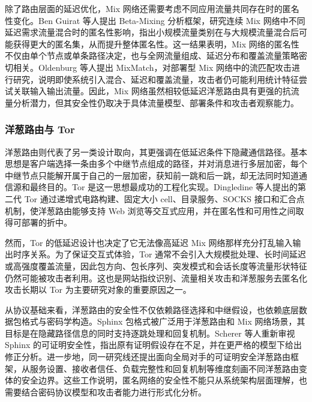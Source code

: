 除了路由层面的延迟优化，Mix 网络还需要考虑不同应用流量共同存在时的匿名性变化。Ben Guirat 等人提出 Beta-Mixing 分析框架，研究连续 Mix 网络中不同延迟需求流量混合时的匿名性影响，指出小规模流量类别在与大规模流量混合后可能获得更大的匿名集，从而提升整体匿名性\cite{ben2024blending}。这一结果表明，Mix 网络的匿名性不仅由单个节点或单条路径决定，也与全网流量组成、延迟分布和覆盖流量策略密切相关。Oldenburg 等人提出 MixMatch，对部署型 Mix 网络中的流匹配攻击进行研究，说明即使系统引入混合、延迟和覆盖流量，攻击者仍可能利用统计特征尝试关联输入输出流量\cite{oldenburg2024mixmatch}。因此，Mix 网络虽然相较低延迟洋葱路由具有更强的抗流量分析潜力，但其安全性仍取决于具体流量模型、部署条件和攻击者观察能力。

\subsubsection{洋葱路由与 Tor}
洋葱路由则代表了另一类设计取向，其更强调在低延迟条件下隐藏通信路径。基本思想是客户端选择一条由多个中继节点组成的路径，并对消息进行多层加密，每个中继节点只能解开属于自己的一层加密，获知前一跳和后一跳，却无法同时知道通信源和最终目的。Tor 是这一思想最成功的工程化实现。Dingledine 等人提出的第二代 Tor 通过递增式电路构建、固定大小 cell、目录服务、SOCKS 接口和汇合点机制，使洋葱路由能够支持 Web 浏览等交互式应用，并在匿名性和可用性之间取得可部署的折中\cite{dingledine2004tor}。

然而，Tor 的低延迟设计也决定了它无法像高延迟 Mix 网络那样充分打乱输入输出时序关系。为了保证交互式体验，Tor 通常不会引入大规模批处理、长时间延迟或高强度覆盖流量，因此包方向、包长序列、突发模式和会话长度等流量形状特征仍然可能被攻击者利用。这也是网站指纹识别、流量相关攻击和洋葱服务去匿名化攻击长期以 Tor 为主要研究对象的重要原因之一。

从协议基础来看，洋葱路由的安全性不仅依赖路径选择和中继假设，也依赖底层数据包格式与密码学构造。Sphinx 包格式被广泛用于洋葱路由和 Mix 网络场景，其目标是在隐藏路径信息的同时支持逐跳处理和回复机制。Scherer 等人重新审视 Sphinx 的可证明安全性，指出原有证明假设存在不足，并在更严格的模型下给出修正分析\cite{scherer2023provable}。进一步地，同一研究线还提出面向全局对手的可证明安全洋葱路由框架，从服务设置、接收者信任、负载完整性和回复机制等维度刻画不同洋葱路由变体的安全边界\cite{scherer2024framework}。这些工作说明，匿名网络的安全性不能只从系统架构层面理解，也需要结合密码协议模型和攻击者能力进行形式化分析。

